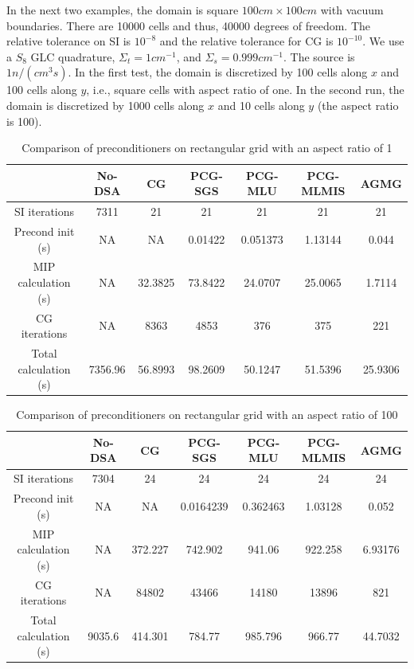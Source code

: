  In the next two examples, the domain is square $100cm
\times 100cm$ with vacuum boundaries. There are 10000 cells and thus, 40000
degrees of freedom. The relative tolerance on SI is $10^{-8}$ and the relative
tolerance for CG is $10^{-10}$. We use a $S_8$ GLC quadrature, $\Sigma_t =
1cm^{-1}$, and $\Sigma_s = 0.999cm^{-1}$. The source is $1n/(cm^3s)$. In the
first test, the domain is discretized by 100 cells along $x$ and 100 cells
along $y$, i.e., square cells with aspect ratio of one. In the second run, 
the domain is discretized by 1000 cells along $x$ and 10 cells along $y$ 
(the aspect ratio is 100).
\begin{table}[H]
  \caption{Comparison of preconditioners on rectangular grid with an aspect
  ratio of 1}
  \begin{center}
    \begin{tabular}{|c|c|c|c|c|c|c|}
      \hline
       & No-DSA & CG & PCG-SGS & PCG-MLU & PCG-MLMIS & AGMG \\
      \hline
      SI iterations & 7311      & 21      & 21      & 21       & 21      & 21 \\
   Precond init (s) & NA        & NA      & 0.01422 & 0.051373 & 1.13144 &
      0.044 \\
MIP calculation (s) & NA        & 32.3825 & 73.8422 & 24.0707  & 25.0065 &
      1.7114 \\
      CG iterations & NA        & 8363    & 4853    & 376      & 375     &
      221\\
Total calculation (s) & 7356.96 & 56.8993 & 98.2609 & 50.1247  & 51.5396 &
      25.9306 \\
      \hline
    \end{tabular}
    \label{table_ar_1}
  \end{center}
\end{table}
\begin{table}[H]
  \caption{Comparison of preconditioners on rectangular grid with an aspect
  ratio of 100}
  \begin{center}
    \begin{tabular}{|c|c|c|c|c|c|c|}
      \hline
       & No-DSA & CG & PCG-SGS & PCG-MLU & PCG-MLMIS & AGMG \\
      \hline
      SI iterations & 7304    & 24      & 24        & 24       & 24      & 24 \\
   Precond init (s) & NA      & NA      & 0.0164239 & 0.362463 & 1.03128 & 0.052 \\
MIP calculation (s) & NA      & 372.227 & 742.902   & 941.06   & 922.258 &
      6.93176 \\
      CG iterations & NA      & 84802   & 43466     & 14180    & 13896   & 821 \\
Total calculation (s) & 9035.6 & 414.301 & 784.77   & 985.796  & 966.77  &
      44.7032 \\
      \hline
    \end{tabular}
    \label{table_ar_100}
  \end{center}
\end{table}                  
